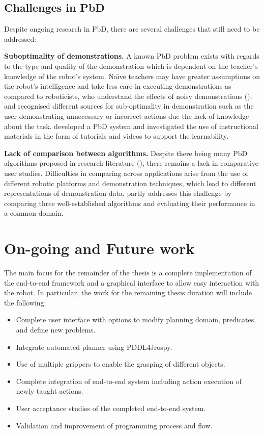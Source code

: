 \subsection{Challenges in PbD}\label{sssec:Challenges in PbD}
Despite ongoing research in PbD, there are several challenges that still need to be addressed:

\textbf{Suboptimality of demonstrations.}
A known PbD problem exists with regards to the type and quality of the demonstration which is dependent on the teacher's knowledge of the robot's system.
Na\"{\i}ve teachers may have greater assumptions on the robot's intelligence and take less care in executing demonstrations as compared to roboticists, who understand the effects of noisy demonstrations (\cite{suay2012practical}).
\cite{chen2003programing} and \cite{kaiser1995obtaining} recognised different sources for sub-optimality in demonstration such as the user demonstrating unnecessary or incorrect actions due the lack of knowledge about the task.
\cite{cakmak2014teaching} developed a PbD system and investigated the use of instructional materials in the form of tutorials and videos to support the learnability.

\textbf{Lack of comparison between algorithms.}
Despite there being many PbD algorithms proposed in research literature (\cite{argall2009survey,billing2010formalism}), there remains a lack in comparative user studies.
Difficulties in comparing across applications arise from the use of different robotic platforms and demonstration techniques, which lead to different representations of demonstration data.
\cite{suay2012practical} partly addresses this challenge by comparing three well-established algorithms and evaluating their performance in a common domain.


\section{On-going and Future work}
The main focus for the remainder of the thesis is a complete implementation of the end-to-end framework and a graphical interface to allow easy interaction with the robot. In particular, the work for the remaining thesis duration will include the following:
\begin{itemize}
\item Complete user interface with options to modify planning domain, predicates, and define new problems.
\item Integrate automated planner using PDDL4Jrospy.
\item Use of multiple grippers to enable the grasping of different objects.
\item Complete integration of end-to-end system including action execution of newly taught actions.
\item User acceptance studies of the completed end-to-end system.
\item Validation and improvement of programming process and flow.
\end{itemize}

